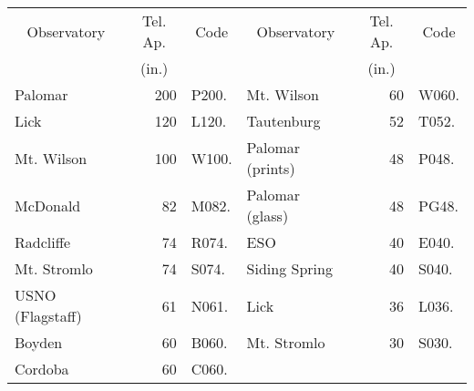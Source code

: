 \begin{center}
\begin{tabular}{l|r|l|l|r|l}
\hline
\multicolumn{1}{c|}{Observatory} & \multicolumn{1}{c|}{Tel. Ap.} &
\multicolumn{1}{c|}{Code}        & \multicolumn{1}{c|}{Observatory} &
\multicolumn{1}{c|}{Tel. Ap.}    & \multicolumn{1}{c}{Code} \\
\multicolumn{1}{c|}{}            & \multicolumn{1}{c|}{(in.)} &
\multicolumn{1}{c|}{}            & \multicolumn{1}{c|}{} &
\multicolumn{1}{c|}{(in.)}       & \multicolumn{1}{c}{} \\
\hline
  Palomar          & 200 & P200. & Mt. Wilson       & 60 & W060. \\
  Lick             & 120 & L120. & Tautenburg       & 52 & T052. \\
  Mt. Wilson       & 100 & W100. & Palomar (prints) & 48 & P048. \\
  McDonald         &  82 & M082. & Palomar (glass)  & 48 & PG48. \\
  Radcliffe        &  74 & R074. & ESO              & 40 & E040. \\
  Mt. Stromlo      &  74 & S074. & Siding Spring    & 40 & S040. \\
  USNO (Flagstaff) &  61 & N061. & Lick             & 36 & L036. \\
  Boyden           &  60 & B060. & Mt. Stromlo      & 30 & S030. \\
  Cordoba          &  60 & C060. &                  &    &       \\
\hline
\end{tabular}
\label{t:plate}
\end{center}

